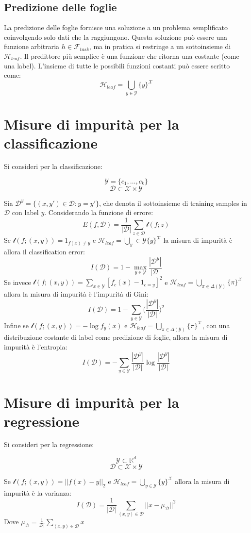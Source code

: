 	\subsection{Predizione delle foglie}
	La predizione delle foglie fornisce una soluzione a un problema semplificato coinvolgendo solo dati che la raggiungono.
	Questa soluzione pu\`o essere una funzione arbitraria $h\in\mathcal{F}_{task}$, ma in pratica si restringe a un sottoinsieme di $\mathcal{H}_{leaf}$.
	Il predittore pi\`u semplice \`e una funzione che ritorna una costante (come una label).
	L'insieme di tutte le possibili funzioni costanti pu\`o essere scritto come:
	$$\mathcal{H}_{leaf} = \bigcup\limits_{y\in\mathcal{Y}}\{y\}^{\mathcal{X}}$$

\section{Misure di impurit\`a per la classificazione}
Si consideri per la classificazione:
\begin{multicols}{2}
	$$\mathcal{Y} = \{c_1,\dots,c_k\}$$
	$$\mathcal{D}\subset\mathcal{X}\times\mathcal{Y}$$
\end{multicols}
Sia $\mathcal{D}^y = \{(x, y')\in \mathcal{D}: y = y'\}$, che denota il sottoinsieme di training samples in $\mathcal{D}$ con label $y$.
Considerando la funzione di errore:
$$E(f,\mathcal{D}) = \dfrac{1}{|\mathcal{D}|}\sum\limits_{z\in\mathcal{D}}\mathcal{l}(f;z)$$
Se $\mathcal{l}(f;(x,y))=1_{f(x)\neq y}$ e $\mathcal{H}_{leaf} = \bigcup\limits_y\in\mathcal{Y}\{y\}^\mathcal{X}$ la misura di impurit\`a \`e allora il classification error:
$$I(\mathcal{D})= 1 -\max\limits_{y\in\mathcal{Y}}\dfrac{|\mathcal{D}^y|}{|\mathcal{D}|}$$
Se invece $\mathcal{l}(f;(x,y))=\sum\limits_{x\in\mathcal{Y}}[f_c(x)-1_{c=y}]^2$ e $\mathcal{H}_{leaf}=\bigcup\limits_{\pi\in\Delta(\mathcal{Y})}\{\pi\}^\mathcal{X}$ allora la misura di impurit\`a \`e l'impurit\`a di Gini:
$$I(\mathcal{D}) = 1-\sum\limits_{y\in\mathcal{Y}}\biggl(\dfrac{|\mathcal{D}^y|}{|\mathcal{D}|}\biggr)^2$$
Infine se $\mathcal{l}(f;(x,y))=-\log f_y(x)$ e $\mathcal{H}_{leaf} = \bigcup\limits_{\pi\in\Delta(\mathcal{Y})}\{\pi\}^\mathcal{X}$, con una distribuzione costante di label come predizione di foglie, allora la misura di impurit\`a \`e l'entropia:
$$I(\mathcal{D})=-\sum\limits_{y\in\mathcal{Y}}\dfrac{|\mathcal{D}^y|}{|\mathcal{D}|}\log\dfrac{|\mathcal{D}^y|}{|\mathcal{D}|}$$

\section{Misure di impurit\`a per la regressione}
Si consideri per la regressione:
\begin{multicols}{2}
	$$\mathcal{Y}\subset\mathbb{R}^d$$
	$$\mathcal{D}\subset\mathcal{X}\times\mathcal{Y}$$
\end{multicols}
Se $\mathcal{l}(f;(x,y))=||f(x)-y||_2$ e $\mathcal{H}_{leaf} = \bigcup\limits_{y\in\mathcal{Y}}\{y\}^\mathcal{X}$ allora la misura di impurit\`a \`e la varianza:
$$I(\mathcal{D})=\dfrac{1}{|\mathcal{D}|}\sum\limits_{(x,y)\in\mathcal{D}}||x-\mu_\mathcal{D}||^2$$
Dove $\mu_\mathcal{D} = \frac{1}{\mathcal{D}|}\sum\limits_{(x,y)\in\mathcal{D}}x$

